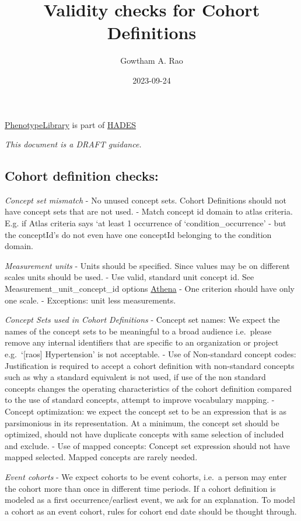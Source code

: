 \documentclass[
]{article}
\title{Validity checks for Cohort Definitions}
\author{Gowtham A. Rao}
\date{2023-09-24}
\begin{document}
\maketitle

{
\setcounter{tocdepth}{2}
\tableofcontents
}
\href{https://github.com/OHDSI/PhenotypeLibrary}{PhenotypeLibrary} is
part of \href{https://ohdsi.github.io/Hades/}{HADES}

\emph{This document is a DRAFT guidance.}

\hypertarget{cohort-definition-checks}{%
\subsection{Cohort definition checks:}\label{cohort-definition-checks}}

\emph{Concept set mismatch} - No unused concept sets. Cohort Definitions
should not have concept sets that are not used. - Match concept id
domain to atlas criteria. E.g. if Atlas criteria says `at least 1
occurrence of `condition\_occurrence' - but the conceptId's do not even
have one conceptId belonging to the condition domain.

\emph{Measurement units} - Units should be specified. Since values may
be on different scales units should be used. - Use valid, standard unit
concept id. See Measurement\_unit\_concept\_id options
\href{https://athena.ohdsi.org/search-terms/terms?domain=Unit\&standardConcept=Standard\&invalidReason=Valid\&page=1\&pageSize=500\&query=}{Athena}
- One criterion should have only one scale. - Exceptions: unit less
measurements.

\emph{Concept Sets used in Cohort Definitions} - Concept set names: We
expect the names of the concept sets to be meaningful to a broad
audience i.e.~please remove any internal identifiers that are specific
to an organization or project e.g.~`{[}raos{]} Hypertension' is not
acceptable. - Use of Non-standard concept codes: Justification is
required to accept a cohort definition with non-standard concepts such
as why a standard equivalent is not used, if use of the non standard
concepts changes the operating characteristics of the cohort definition
compared to the use of standard concepts, attempt to improve vocabulary
mapping. - Concept optimization: we expect the concept set to be an
expression that is as parsimonious in its representation. At a minimum,
the concept set should be optimized, should not have duplicate concepts
with same selection of included and exclude. - Use of mapped concepts:
Concept set expression should not have mapped selected. Mapped concepts
are rarely needed.

\emph{Event cohorts} - We expect cohorts to be event cohorts, i.e.~a
person may enter the cohort more than once in different time periods. If
a cohort definition is modeled as a first occurrence/earliest event, we
ask for an explanation. To model a cohort as an event cohort, rules for
cohort end date should be thought through.
\end{document}
